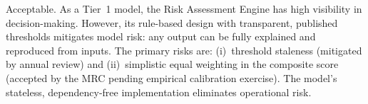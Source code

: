 \documentclass[11pt,a4paper]{article}
\begin{document}
Acceptable. As a Tier~1 model, the Risk Assessment Engine has high visibility in decision-making. However, its rule-based design with transparent, published thresholds mitigates model risk: any output can be fully explained and reproduced from inputs. The primary risks are: (i)~threshold staleness (mitigated by annual review) and (ii)~simplistic equal weighting in the composite score (accepted by the MRC pending empirical calibration exercise). The model's stateless, dependency-free implementation eliminates operational risk.

\clearpage

\mkmchangelog

\end{document}
